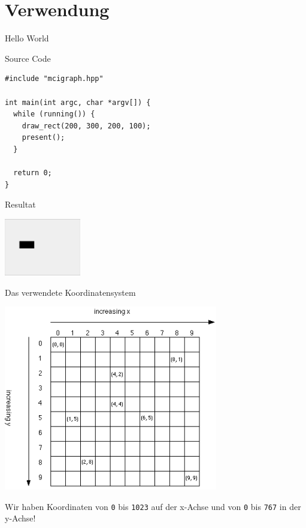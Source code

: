 \documentclass[presentation]{beamer}
\begin{document}
\section{Verwendung}
\label{sec:org8345255}
\begin{frame}[label={sec:orgaaa5f04},fragile]{Hello World}
 \begin{block}{Source Code}
\begin{verbatim}
#include "mcigraph.hpp"

int main(int argc, char *argv[]) {
  while (running()) {
    draw_rect(200, 300, 200, 100);
    present();
  }

  return 0;
}
\end{verbatim}
\end{block}
\begin{block}{Resultat}
\begin{center}\begin{center}
\includegraphics[width=0.25\textwidth]{data/14/80e905-1de5-4f8b-a64b-5545534fed55/screenshot-20170303-163618.png}
\end{center}\end{center}
\end{block}
\end{frame}
\begin{frame}[label={sec:orgd12e695},fragile]{Das verwendete Koordinatensystem}
 \begin{center}\begin{center}
\includegraphics[width=0.7\textwidth]{data/16/2a5cf8-7d19-417f-b610-b412a11366f8/screenshot-20170303-173401.png}
\end{center}\end{center}
Wir haben Koordinaten von {\color{solarizedYellow}\texttt{0} }bis {\color{solarizedYellow}\texttt{1023} }auf der x-Achse und von {\color{solarizedYellow}\texttt{0}}
bis {\color{solarizedYellow}\texttt{767} }in der y-Achse!
\end{frame}
\end{document}
